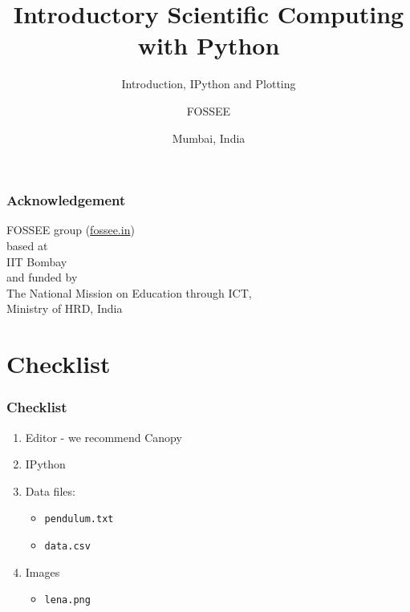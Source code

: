 \documentclass[14pt,compress]{beamer}
\title[Interactive Plotting]{Introductory Scientific Computing with
Python}
\subtitle{Introduction, IPython and Plotting}
\author[FOSSEE] {FOSSEE}
\institute[IIT Bombay] {Department of Aerospace Engineering\\IIT Bombay}
\date[] {Mumbai, India
}
\newcommand{\typ}[1]{\lstinline{#1}}
\begin{document}
\begin{frame}
  \maketitle
\end{frame}


\begin{frame}
    \frametitle{Acknowledgement}
    \Large
    \begin{center}
        \alert{FOSSEE group (\url{fossee.in})} \\
        based at\\
        \alert{IIT Bombay}\\
        and funded by\\
        The National Mission on Education through ICT, \\
        \alert{Ministry of HRD, India}
    \end{center}
\end{frame}

\section{Checklist}
\begin{frame}
\frametitle{Checklist}
  \begin{enumerate}
    \item Editor - we recommend \alert{Canopy}
    \item IPython
    \item Data files:
      \begin{itemize}
      \item \typ{pendulum.txt}
      \item \typ{data.csv}
      \end{itemize}
    \item Images
      \begin{itemize}
      \item \typ{lena.png}
      \end{itemize}
  \end{enumerate}
\end{frame}
\end{document}
